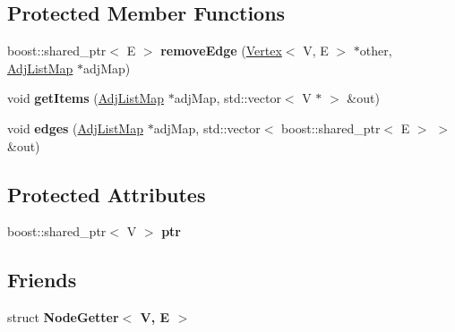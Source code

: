 \subsection*{Protected Member Functions}
\begin{DoxyCompactItemize}
\item 
\hypertarget{classrepast_1_1_vertex_a0f9b617f21236fa05f28b1c84096be44}{boost\-::shared\-\_\-ptr$<$ E $>$ {\bfseries remove\-Edge} (\hyperlink{classrepast_1_1_vertex}{Vertex}$<$ V, E $>$ $\ast$other, \hyperlink{classrepast_1_1_vertex_a87cfe13bd6b9bd535e6f3d08329908f6}{Adj\-List\-Map} $\ast$adj\-Map)}\label{classrepast_1_1_vertex_a0f9b617f21236fa05f28b1c84096be44}

\item 
\hypertarget{classrepast_1_1_vertex_a494e33db33ecb44c23f8977c1f7bf3d1}{void {\bfseries get\-Items} (\hyperlink{classrepast_1_1_vertex_a87cfe13bd6b9bd535e6f3d08329908f6}{Adj\-List\-Map} $\ast$adj\-Map, std\-::vector$<$ V $\ast$ $>$ \&out)}\label{classrepast_1_1_vertex_a494e33db33ecb44c23f8977c1f7bf3d1}

\item 
\hypertarget{classrepast_1_1_vertex_afe678af8ef0f798093f5aa627cb7330f}{void {\bfseries edges} (\hyperlink{classrepast_1_1_vertex_a87cfe13bd6b9bd535e6f3d08329908f6}{Adj\-List\-Map} $\ast$adj\-Map, std\-::vector$<$ boost\-::shared\-\_\-ptr$<$ E $>$ $>$ \&out)}\label{classrepast_1_1_vertex_afe678af8ef0f798093f5aa627cb7330f}

\end{DoxyCompactItemize}
\subsection*{Protected Attributes}
\begin{DoxyCompactItemize}
\item 
\hypertarget{classrepast_1_1_vertex_a193ef2428a4546a0c23cc659c0511992}{boost\-::shared\-\_\-ptr$<$ V $>$ {\bfseries ptr}}\label{classrepast_1_1_vertex_a193ef2428a4546a0c23cc659c0511992}

\end{DoxyCompactItemize}
\subsection*{Friends}
\begin{DoxyCompactItemize}
\item 
\hypertarget{classrepast_1_1_vertex_aa1b5df339bdaa90753152ddbbb44cdde}{struct {\bfseries Node\-Getter$<$ V, E $>$}}\label{classrepast_1_1_vertex_aa1b5df339bdaa90753152ddbbb44cdde}

\end{DoxyCompactItemize}


